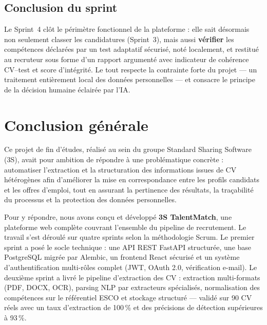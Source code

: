 \documentclass[12pt,a4paper]{report}
\begin{document}
\section{Conclusion du sprint}

Le Sprint~4 clôt le périmètre fonctionnel de la plateforme : elle sait désormais non seulement classer les candidatures (Sprint~3), mais aussi \textbf{vérifier} les compétences déclarées par un test adaptatif sécurisé, noté localement, et restitué au recruteur sous forme d'un rapport argumenté avec indicateur de cohérence CV--test et score d'intégrité. Le tout respecte la contrainte forte du projet --- un traitement entièrement local des données personnelles --- et consacre le principe de la décision humaine éclairée par l'IA.
\newpage

\chapter*{Conclusion générale}

Ce projet de fin d'études, réalisé au sein du groupe Standard Sharing Software (3S), avait pour ambition de répondre à une problématique concrète : automatiser l'extraction et la structuration des informations issues de CV hétérogènes afin d'améliorer la mise en correspondance entre les profils candidats et les offres d'emploi, tout en assurant la pertinence des résultats, la traçabilité du processus et la protection des données personnelles.

\medskip

Pour y répondre, nous avons conçu et développé \textbf{3S TalentMatch}, une plateforme web complète couvrant l'ensemble du pipeline de recrutement. Le travail s'est déroulé sur quatre sprints selon la méthodologie Scrum. Le premier sprint a posé le socle technique : une API REST FastAPI structurée, une base PostgreSQL migrée par Alembic, un frontend React sécurisé et un système d'authentification multi-rôles complet (JWT, OAuth 2.0, vérification e-mail). Le deuxième sprint a livré le pipeline d'extraction des CV : extraction multi-formats (PDF, DOCX, OCR), parsing NLP par extracteurs spécialisés, normalisation des compétences sur le référentiel ESCO et stockage structuré --- validé sur 90 CV réels avec un taux d'extraction de 100\,\% et des précisions de détection supérieures à 93\,\%.
\end{document}
